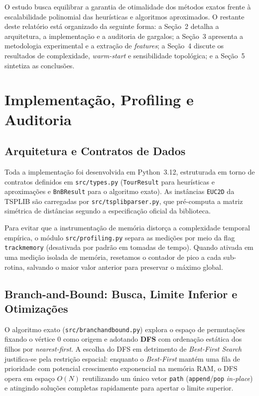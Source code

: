 \documentclass[12pt,a4paper]{article}
\renewcommand{\_}{\origunderscore\hspace{0pt}}
\begin{document}
O estudo busca equilibrar a garantia de otimalidade dos métodos exatos frente à escalabilidade polinomial das heurísticas e algoritmos aproximados. O restante deste relatório está organizado da seguinte forma: a Seção~2 detalha a arquitetura, a implementação e a auditoria de gargalos; a Seção~3 apresenta a metodologia experimental e a extração de \textit{features}; a Seção~4 discute os resultados de complexidade, \textit{warm-start} e sensibilidade topológica; e a Seção~5 sintetiza as conclusões.

\section{Implementação, Profiling e Auditoria}

\subsection{Arquitetura e Contratos de Dados}
Toda a implementação foi desenvolvida em Python~3.12, estruturada em torno de contratos definidos em \texttt{src/types.py} (\texttt{TourResult} para heurísticas e aproximações e \texttt{BnBResult} para o algoritmo exato). As instâncias \texttt{EUC\_2D} da TSPLIB são carregadas por \texttt{src/tsplib\_parser.py}, que pré-computa a matriz simétrica de distâncias segundo a especificação oficial da biblioteca.

Para evitar que a instrumentação de memória distorça a complexidade temporal empírica, o módulo \texttt{src/profiling.py} separa as medições por meio da flag \texttt{track\_memory} (desativada por padrão em tomadas de tempo). Quando ativada em uma medição isolada de memória, resetamos o contador de pico a cada sub-rotina, salvando o maior valor anterior para preservar o máximo global.

\subsection{Branch-and-Bound: Busca, Limite Inferior e Otimizações}
O algoritmo exato (\texttt{src/branch\_and\_bound.py}) explora o espaço de permutações fixando o vértice $0$ como origem e adotando \textbf{DFS} com ordenação estática dos filhos por \textit{nearest-first}. A escolha do DFS em detrimento de \textit{Best-First Search} justifica-se pela restrição espacial: enquanto o \textit{Best-First} mantém uma fila de prioridade com potencial crescimento exponencial na memória RAM, o DFS opera em espaço $O(N)$ reutilizando um único vetor \texttt{path} (\texttt{append}/\texttt{pop} \textit{in-place}) e atingindo soluções completas rapidamente para apertar o limite superior.
\end{document}
